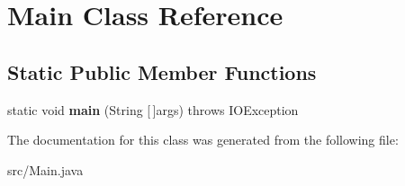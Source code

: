 \hypertarget{class_main}{}\section{Main Class Reference}
\label{class_main}
\subsection*{Static Public Member Functions}
\begin{DoxyCompactItemize}
\item 
\mbox{\label{class_main_a8df768461f886ac6b6051146e3e10c4d}} 
static void {\bfseries main} (String \mbox{[}$\,$\mbox{]}args)  throws I\+O\+Exception 
\end{DoxyCompactItemize}


The documentation for this class was generated from the following file\+:\begin{DoxyCompactItemize}
\item 
src/Main.\+java\end{DoxyCompactItemize}
